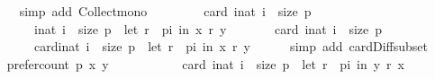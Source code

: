 \begin{isabellebody}
\ \ \ \ \isamarkupfalse%
\ {\isacharparenleft}{\kern0pt}simp\ add{\isacharcolon}{\kern0pt}\ Collect{\isacharunderscore}{\kern0pt}mono{\isacharparenright}{\kern0pt}\isanewline
\ \ \isamarkupfalse%
\ {}{}{\isacharcolon}{\kern0pt}\isanewline
\ \ \ \ {\isachardoublequoteopen}card\ {\isacharparenleft}{\kern0pt}{\isacharbraceleft}{\kern0pt}i{\isacharcolon}{\kern0pt}{\isacharcolon}{\kern0pt}nat{\isachardot}{\kern0pt}\ i\ {\isacharless}{\kern0pt}\ size\ p{\isacharbraceright}{\kern0pt}\ {\isacharminus}{\kern0pt}\isanewline
\ \ \ \ \ \ \ \ {\isacharbraceleft}{\kern0pt}i{\isacharcolon}{\kern0pt}{\isacharcolon}{\kern0pt}nat{\isachardot}{\kern0pt}\ i\ {\isacharless}{\kern0pt}\ size\ p\ {\isasymand}\ {\isacharparenleft}{\kern0pt}let\ r\ {\isacharequal}{\kern0pt}\ {\isacharparenleft}{\kern0pt}p{\isacharbang}{\kern0pt}i{\isacharparenright}{\kern0pt}\ in\ {\isacharparenleft}{\kern0pt}x\ {\isasympreceq}\isactrlsub r\ y{\isacharparenright}{\kern0pt}{\isacharparenright}{\kern0pt}{\isacharbraceright}{\kern0pt}{\isacharparenright}{\kern0pt}\ {\isacharequal}{\kern0pt}\isanewline
\ \ \ \ \ \ {\isacharparenleft}{\kern0pt}card\ {\isacharbraceleft}{\kern0pt}i{\isacharcolon}{\kern0pt}{\isacharcolon}{\kern0pt}nat{\isachardot}{\kern0pt}\ i\ {\isacharless}{\kern0pt}\ size\ p{\isacharbraceright}{\kern0pt}{\isacharparenright}{\kern0pt}\ {\isacharminus}{\kern0pt}\isanewline
\ \ \ \ \ \ \ \ card{\isacharparenleft}{\kern0pt}{\isacharbraceleft}{\kern0pt}i{\isacharcolon}{\kern0pt}{\isacharcolon}{\kern0pt}nat{\isachardot}{\kern0pt}\ i\ {\isacharless}{\kern0pt}\ size\ p\ {\isasymand}\ {\isacharparenleft}{\kern0pt}let\ r\ {\isacharequal}{\kern0pt}\ {\isacharparenleft}{\kern0pt}p{\isacharbang}{\kern0pt}i{\isacharparenright}{\kern0pt}\ in\ {\isacharparenleft}{\kern0pt}x\ {\isasympreceq}\isactrlsub r\ y{\isacharparenright}{\kern0pt}{\isacharparenright}{\kern0pt}{\isacharbraceright}{\kern0pt}{\isacharparenright}{\kern0pt}{\isachardoublequoteclose}\isanewline
\ \ \ \ \isamarkupfalse%
\ {\isacharparenleft}{\kern0pt}simp\ add{\isacharcolon}{\kern0pt}\ card{\isacharunderscore}{\kern0pt}Diff{\isacharunderscore}{\kern0pt}subset{\isacharparenright}{\kern0pt}\isanewline
\ \ \isamarkupfalse%
\ {\isachardoublequoteopen}prefer{\isacharunderscore}{\kern0pt}count\ p\ x\ y\ {\isacharequal}{\kern0pt}\isanewline
\ \ \ \ \ \ \ \ \ \ card\ {\isacharbraceleft}{\kern0pt}i{\isacharcolon}{\kern0pt}{\isacharcolon}{\kern0pt}nat{\isachardot}{\kern0pt}\ i\ {\isacharless}{\kern0pt}\ size\ p\ {\isasymand}\ {\isacharparenleft}{\kern0pt}let\ r\ {\isacharequal}{\kern0pt}\ {\isacharparenleft}{\kern0pt}p{\isacharbang}{\kern0pt}i{\isacharparenright}{\kern0pt}\ in\ {\isacharparenleft}{\kern0pt}y\ {\isasympreceq}\isactrlsub r\ x{\isacharparenright}{\kern0pt}{\isacharparenright}{\kern0pt}{\isacharbraceright}{\kern0pt}{\isachardoublequoteclose}\isanewline

\end{isabellebody}
